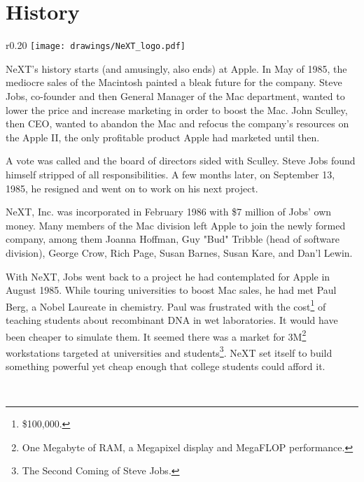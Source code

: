 \section{History}

\begin{wrapfigure}[8]{r}{0.20\textwidth}
\centering
\texttt{[image: drawings/NeXT\_logo.pdf]}
\end{wrapfigure}
\par
NeXT's history starts (and amusingly, also ends) at Apple. In May of 1985, the mediocre sales of the Macintosh painted a bleak future for the company. Steve Jobs, co-founder and then General Manager of the Mac department, wanted to lower the price and increase marketing in order to boost the Mac. John Sculley, then CEO, wanted to abandon the Mac and refocus the company's resources on the Apple II, the only profitable product Apple had marketed until then.\\
\par
 A vote was called and the board of directors sided with Sculley. Steve Jobs found himself stripped of all responsibilities. A few months later, on September 13, 1985, he resigned and went on to work on his next project.\\
\par
NeXT, Inc. was incorporated in February 1986 with \$7 million of Jobs' own money. Many members of the Mac division left Apple to join the newly formed company, among them  Joanna Hoffman, Guy "Bud" Tribble (head of software division), George Crow, Rich Page, Susan Barnes, Susan Kare, and Dan'l Lewin.\\ 
\par
With NeXT, Jobs went back to a project he had contemplated for Apple in August 1985. While touring universities to boost Mac sales, he had met Paul Berg, a Nobel Laureate in chemistry. Paul was frustrated with the cost\footnote{\$100,000.} of teaching students about recombinant DNA in wet laboratories. It would have been cheaper to simulate them. It seemed there was a market for 3M\footnote{One Megabyte of RAM, a Megapixel display and MegaFLOP performance.} workstations targeted at universities and students\footnote{The Second Coming of Steve Jobs.}. NeXT set itself to build something powerful yet cheap enough that college students could afford it.\\
\par
{}\\
